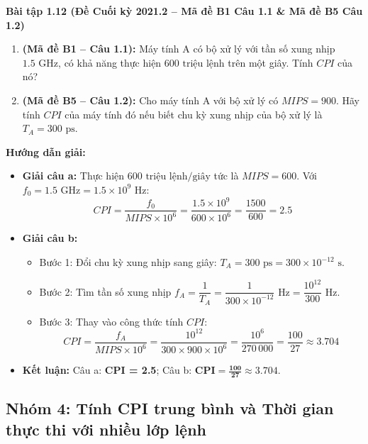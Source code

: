 \textbf{Bài tập 1.12 (Đề Cuối kỳ 2021.2 -- Mã đề B1 Câu 1.1 \& Mã đề B5 Câu 1.2)}
\begin{enumerate}[label=\alph*)]
    \item \textbf{(Mã đề B1 -- Câu 1.1):} Máy tính A có bộ xử lý với tần số xung nhịp $1.5\text{ GHz}$, có khả năng thực hiện $600\text{ triệu lệnh}$ trên một giây. Tính $CPI$ của nó?
    \item \textbf{(Mã đề B5 -- Câu 1.2):} Cho máy tính A với bộ xử lý có $MIPS = 900$. Hãy tính $CPI$ của máy tính đó nếu biết chu kỳ xung nhịp của bộ xử lý là $T_A = 300\text{ ps}$.
\end{enumerate}
\textbf{Hướng dẫn giải:}
\begin{itemize}
    \item \textbf{Giải câu a:} Thực hiện $600\text{ triệu lệnh/giây}$ tức là $MIPS = 600$. Với $f_0 = 1.5\text{ GHz} = 1.5 \times 10^9\text{ Hz}$:
    $$CPI = \frac{f_0}{MIPS \times 10^6} = \frac{1.5 \times 10^9}{600 \times 10^6} = \frac{1500}{600} = 2.5$$
    \item \textbf{Giải câu b:}
    \begin{itemize}
        \item Bước 1: Đổi chu kỳ xung nhịp sang giây: $T_A = 300\text{ ps} = 300 \times 10^{-12}\text{ s}$.
        \item Bước 2: Tìm tần số xung nhịp $f_A = \dfrac{1}{T_A} = \dfrac{1}{300 \times 10^{-12}}\text{ Hz} = \dfrac{10^{12}}{300}\text{ Hz}$.
        \item Bước 3: Thay vào công thức tính $CPI$:
        $$CPI = \frac{f_A}{MIPS \times 10^6} = \frac{10^{12}}{300 \times 900 \times 10^6} = \frac{10^6}{270\,000} = \frac{100}{27} \approx 3.704$$
    \end{itemize}
    \item \textbf{Kết luận:} Câu a: \textbf{CPI = 2.5}; Câu b: $\mathbf{CPI = \frac{100}{27} \approx 3.704}$.
\end{itemize}

\subsection{Nhóm 4: Tính CPI trung bình và Thời gian thực thi với nhiều lớp lệnh}

